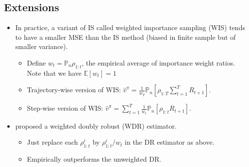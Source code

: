 \documentclass[11pt]{article}
\def\EE{\mathbb{E}}
\def\PP{\mathbb{P}}
\begin{document}
\subsection{Extensions}
\begin{itemize}
		\item In practice, a variant of IS called weighted importance sampling (WIS) tends to have a smaller MSE than the IS method (biased in finite sample but of smaller variance).
		\begin{itemize}
			\item Define $w_t = \PP_n \rho_{1:t}$, the empirical average of importance weight ratios.  Note that we have $\EE[w_t] = 1$
			\item Trajectory-wise version of WIS: $\hat v^\pi = \frac{1}{w_T} \PP_n[\rho_{1:T} \sum_{t=1}^{T} R_{t+1}]$.
			
			\item Step-wise version of WIS: $\hat v^{\pi} = \sum_{t=1}^{T} \frac{1}{w_t}\PP_n\left[ \rho_{1:t} R_{t+1}\right]$.	
		
		\end{itemize}
		 
		 \item \cite{thomas2016data} proposed a weighted doubly robust (WDR) estimator. 
		 \begin{itemize}
		 	\item Just replace each $\rho_{1:t}^i$ by $\rho_{1:t}^i/w_t$ in the DR estimator as above. 
		 	\item  Empirically outperforms the unweighted DR. 
		 \end{itemize}
               \end{itemize}
               

\end{document}
